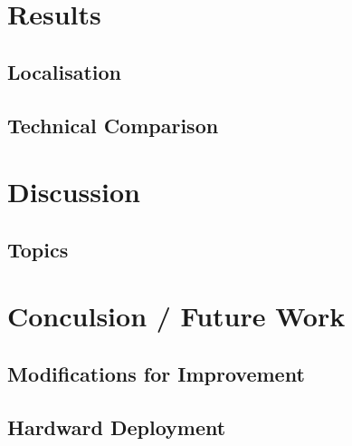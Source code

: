 \documentclass[a4paper]{article}
\begin{document}
\section{Results}
\subsection{Localisation}
\subsection{Technical Comparison}

\section{Discussion}

\subsection{Topics}

\section{Conculsion / Future Work}
\subsection{Modifications for Improvement}
\subsection{Hardward Deployment}



\end{document}
